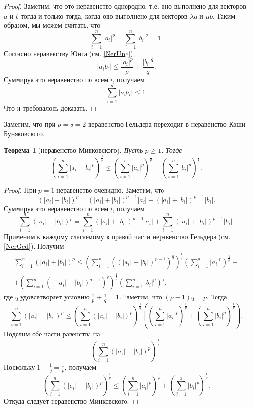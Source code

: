\documentclass[12pt, titlepage, oneside]{amsbook}
\newtheorem{theorem}{Теорема}[chapter]
\theoremstyle{definition}
\theoremstyle{remark}
\begin{document}
\begin{proof}
	Заметим, что это неравенство однородно, т.е. оно выполнено для векторов $a$ и $b$ тогда и только тогда, когда оно выполнено для векторов $\lambda a$ и $\mu b$. Таким образом, мы можем считать, что $$\sum\limits_{i=1}^n |a_i|^p=\sum\limits_{i=1}^n |b_i|^q=1.$$ Согласно неравенству Юнга (см. \ref{NerUng}), $$|a_i b_i|\leq\frac{|a_i|^p}{p}+\frac{|b_i|^q}{q}.$$ Суммируя это неравенство по всем $i$, получаем $$\sum\limits_{i=1}^n |a_i b_i|\leq 1.$$ Что и требовалось доказать.
\end{proof}

Заметим, что при $p=q=2$ неравенство Гельдера переходит в неравенство Коши--Буняковского.

\begin{theorem}[неравенство Минковского]
	\label{NerMin}
	Пусть $p\geq 1$. Тогда $$\left(\sum\limits_{i=1}^n |a_i+b_i|^p\right)^{\frac{1}{p}}\leq\left(\sum\limits_{i=1}^n |a_i|^p\right)^{\frac{1}{p}}+\left(\sum\limits_{i=1}^n |b_i|^p\right)^{\frac{1}{p}}.$$
\end{theorem}

\begin{proof}
	При $p=1$ неравенство очевидно. Заметим, что $$(|a_i|+|b_i|)^p=(|a_i|+|b_i|)^{p-1}|a_i|+(|a_i|+|b_i|)^{p-1}|b_i|.$$ Суммируя это неравенство по всем $i$, получаем $$\sum\limits_{i=1}^n(|a_i|+|b_i|)^p=\sum\limits_{i=1}^n(|a_i|+|b_i|)^{p-1}|a_i|+\sum\limits_{i=1}^n(|a_i|+|b_i|)^{p-1}|b_i|.$$ Применим к каждому слагаемому в правой части неравенство Гельдера (см. \ref{NerGed}). Получим
	\begin{gather*}\sum\limits_{i=1}^n(|a_i|+|b_i|)^p\leq\left(\sum\limits_{i=1}^n((|a_i|+|b_i|)^{p-1})^q\right)^{\frac{1}{q}}\left(\sum\limits_{i=1}^n |a_i|^p\right)^{\frac{1}{p}}+\\
		+\left(\sum\limits_{i=1}^n((|a_i|+|b_i|)^{p-1})^q\right)^{\frac{1}{q}}\left(\sum\limits_{i=1}^n |b_i|^p\right)^{\frac{1}{p}},\end{gather*} где $q$ удовлетворяет условию $\frac{1}{p}+\frac{1}{q}=1$. Заметим, что $(p-1)q=p$. Тогда $$\sum\limits_{i=1}^n(|a_i|+|b_i|)^p\leq \left(\sum\limits_{i=1}^n(|a_i|+|b_i|)^{p}\right)^{\frac{1}{q}}\left(\left(\sum\limits_{i=1}^n |a_i|^p\right)^{\frac{1}{p}}+\left(\sum\limits_{i=1}^n |b_i|^p\right)^{\frac{1}{p}}\right).$$ Поделим обе части равенства на $$\left(\sum\limits_{i=1}^n(|a_i|+|b_i|)^{p}\right)^{\frac{1}{q}}.$$ Поскольку $1-\frac{1}{q}=\frac{1}{p}$, получаем $$\left(\sum\limits_{i=1}^n(|a_i|+|b_i|)^p\right)^{\frac{1}{p}}\leq \left(\sum\limits_{i=1}^n |a_i|^p\right)^{\frac{1}{p}}+\left(\sum\limits_{i=1}^n |b_i|^p\right)^{\frac{1}{p}}.$$ Откуда следует неравенство Минковского.
\end{proof}
\end{document}
